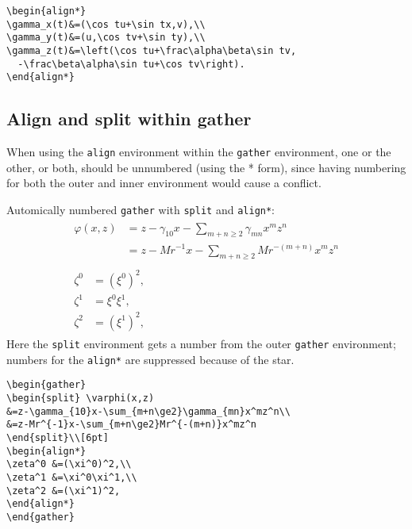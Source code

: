 \begin{verbatim}
\begin{align*}
\gamma_x(t)&=(\cos tu+\sin tx,v),\\
\gamma_y(t)&=(u,\cos tv+\sin ty),\\
\gamma_z(t)&=\left(\cos tu+\frac\alpha\beta\sin tv,
  -\frac\beta\alpha\sin tu+\cos tv\right).
\end{align*}
\end{verbatim}

\newpage
\subsection{Align and split within gather}
When using the {\tt align} environment within the {\tt gather}
environment, one or the other, or both, should be unnumbered
(using the * form), since
having numbering for both the outer and inner environment
would cause a conflict.

Automically numbered {\tt gather} with {\tt split} and {\tt align*}:
\begin{gather}
\begin{split} \varphi(x,z)
&=z-\gamma_{10}x-\sum_{m+n\ge2}\gamma_{mn}x^mz^n\\
&=z-Mr^{-1}x-\sum_{m+n\ge2}Mr^{-(m+n)}x^mz^n
\end{split}\\[6pt]
\begin{align*}
\zeta^0 &=(\xi^0)^2,\\
\zeta^1 &=\xi^0\xi^1,\\
\zeta^2 &=(\xi^1)^2,
\end{align*}
\end{gather}
Here the {\tt split} environment gets a number from the outer
{\tt gather} environment; numbers for the {\tt align*} are suppressed
because of the star.

\begin{verbatim}
\begin{gather}
\begin{split} \varphi(x,z)
&=z-\gamma_{10}x-\sum_{m+n\ge2}\gamma_{mn}x^mz^n\\
&=z-Mr^{-1}x-\sum_{m+n\ge2}Mr^{-(m+n)}x^mz^n
\end{split}\\[6pt]
\begin{align*}
\zeta^0 &=(\xi^0)^2,\\
\zeta^1 &=\xi^0\xi^1,\\
\zeta^2 &=(\xi^1)^2,
\end{align*}
\end{gather}
\end{verbatim}

